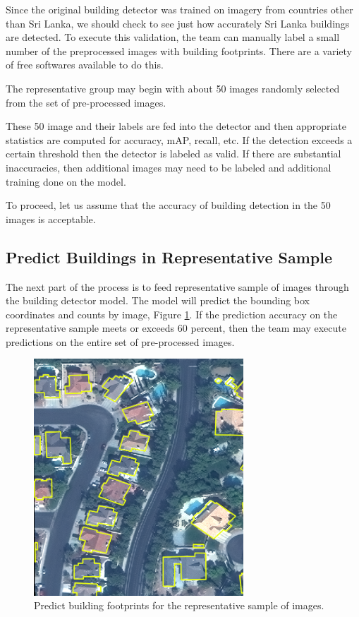 \documentclass[12pt, a4paper, oneside, headinclude, footinclude]{article}
\begin{document}
Since the original building detector was trained on imagery from countries other than Sri Lanka, we should check to see just how accurately Sri Lanka buildings are detected. To execute this validation, the team can manually label a small number of the preprocessed images with building footprints. There are a variety of free softwares available to do this. 

The representative group may begin with about 50 images randomly selected from the set of pre-processed images. 

These 50 image and their labels are fed into the detector and then appropriate statistics are computed for accuracy, mAP, recall, etc. If the detection exceeds a certain threshold then the detector is labeled as valid. If there are substantial inaccuracies, then additional images may need to be labeled and additional training done on the model. 

To proceed, let us assume that the accuracy of building detection in the 50 images is acceptable.

\subsection{Predict Buildings in Representative Sample}

The next part of the process is to feed representative sample of images through
the building detector model. The model will predict the bounding box coordinates
and counts by image, Figure \ref{fig:predictions}. If the prediction accuracy on
the representative sample meets or exceeds 60 percent, then the team may
execute predictions on the entire set of pre-processed images. 

\begin{figure}
	\centering
    \includegraphics[width=0.7\textwidth]{images/detector_eg_edited.png}
    \caption[Building Footprint Prediction] {Predict building footprints for the
      representative sample of images.}
    \label{fig:predictions}
\end{figure}
\end{document}
